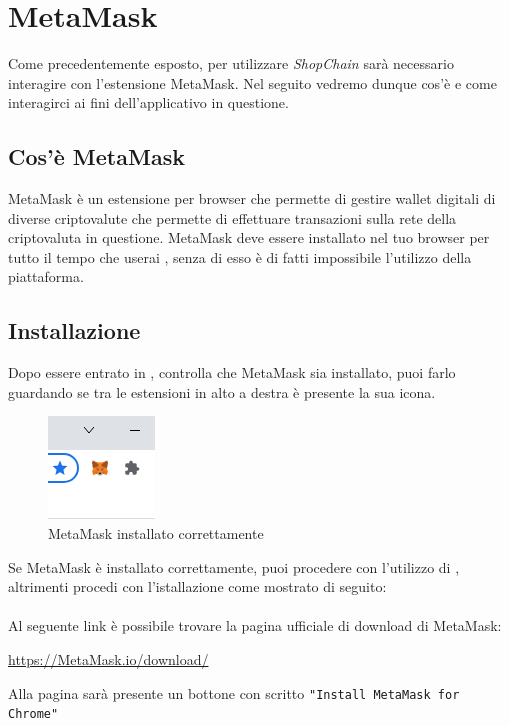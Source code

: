 \section{MetaMask}\label{section:MetaMask}
Come precedentemente esposto, per utilizzare \textit{ShopChain} sarà necessario interagire con l'estensione MetaMask. Nel seguito vedremo dunque cos'è e come interagirci ai fini dell'applicativo in questione.

\subsection{Cos'è MetaMask}
MetaMask è un estensione per browser che permette di gestire wallet digitali di diverse criptovalute\glo{} che permette di effettuare transazioni sulla rete della criptovaluta in questione.
MetaMask deve essere installato nel tuo browser per tutto il tempo che userai \projectName{}, senza di esso è di fatti impossibile l'utilizzo della piattaforma.
\subsection{Installazione}
Dopo essere entrato in \projectName{}, controlla che MetaMask sia installato, puoi farlo guardando se tra le estensioni in alto a destra è presente la sua icona.

    \begin{figure}
        \centering
        \includegraphics{immagini/MetaMask_installed.png}
        \caption{MetaMask installato correttamente}
    \end{figure}   
 Se MetaMask è installato correttamente, puoi procedere con l'utilizzo di \projectName, altrimenti procedi con l'istallazione come mostrato di seguito:\\\\

 Al seguente link è possibile trovare la pagina ufficiale di download di MetaMask:
 \begin{center}
     \url{https://MetaMask.io/download/}
 \end{center}

 Alla pagina sarà presente un bottone con scritto \texttt{"Install MetaMask for Chrome"}

